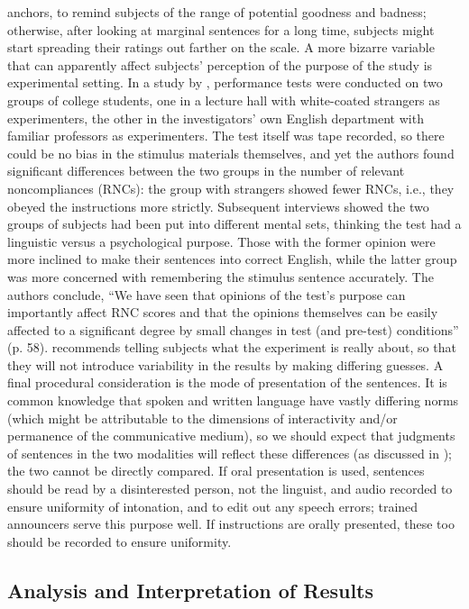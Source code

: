  anchors, to remind subjects of the range of potential goodness and badness; otherwise, after looking at marginal sentences for a long time, subjects might start spreading their ratings out farther on the scale. A more bizarre variable that can apparently affect subjects' perception of the purpose of the study is experimental setting. In a study by \citet{GreenbaumEtAl1970}, performance tests were conducted on two groups of college students, one in a lecture hall with white-coated strangers as experimenters, the other in the investigators' own English department with familiar professors as experimenters. The test itself was tape recorded, so there could be no bias in the stimulus materials themselves, and yet the authors found significant differences between the two groups in the number of relevant noncompliances (RNCs): the group with strangers showed fewer RNCs, i.e., they obeyed the instructions more strictly. Subsequent interviews showed the two groups of subjects had been put into different mental sets, thinking the test had a linguistic versus a psychological purpose. Those with the former opinion were more inclined to make their sentences into correct English, while the latter group was more concerned with remembering the stimulus sentence accurately. The authors conclude, ``We have seen that opinions of the test's purpose can importantly affect RNC scores and that the opinions themselves can be easily affected to a significant degree by small changes in test (and pre-test) conditions'' (p. 58). \citet{Greenbaum1977c} recommends telling subjects what the experiment is really about, so that they will not introduce variability in the results by making differing guesses. A final procedural consideration is the mode of presentation of the sentences. It is common knowledge that spoken and written language have vastly differing norms (which might be attributable to the dimensions of interactivity and/or permanence of the communicative medium), so we should expect that judgments of sentences in the two modalities will reflect these differences (as discussed in ); the two cannot be directly compared. If oral presentation is used, sentences should be read by a disinterested person, not the linguist, and audio recorded to ensure uniformity of intonation, and to edit out any speech errors; trained announcers serve this purpose well. If instructions are orally presented, these too should be recorded to ensure uniformity.

 \subsection{Analysis and Interpretation of Results}\label{sec:6.3.3}

